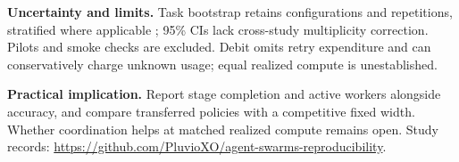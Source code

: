 \documentclass[11pt,a4paper]{article}
\begin{document}
\textbf{Uncertainty and limits.}
Task bootstrap retains configurations and repetitions, stratified where
applicable \citep{efron1979bootstrap,field2007clustered}; 95\% CIs lack
cross-study multiplicity correction. Pilots and smoke checks are excluded.
Debit omits retry expenditure and can conservatively charge unknown usage;
equal realized compute is unestablished.

\textbf{Practical implication.}
Report stage completion and active workers alongside accuracy, and compare
transferred policies with a competitive fixed width. Whether coordination
helps at matched realized compute remains open.\newline
Study records: \url{https://github.com/PluvioXO/agent-swarms-reproducibility}.

\par\noindent
\begin{minipage}{\linewidth}
\captionsetup{hypcap=false}
\centering

\label{fig:evidence}
\end{minipage}
\par

\clearpage

\end{document}
